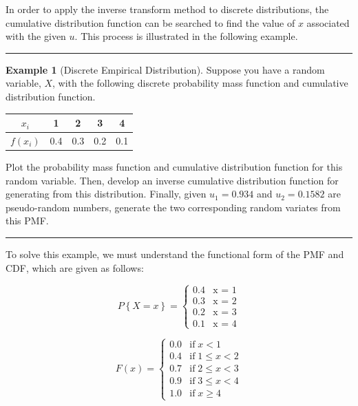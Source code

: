 \documentclass[
]{book}
\theoremstyle{definition}
\theoremstyle{definition}
\newtheorem{example}{Example}[chapter]
\theoremstyle{definition}
\theoremstyle{definition}
\theoremstyle{remark}
\begin{document}
In order to apply the inverse transform method to
discrete distributions, the cumulative distribution function can be
searched to find the value of \(x\) associated with the given \(u\). This
process is illustrated in the following example.

\begin{center}\rule{0.5\linewidth}{0.5pt}\end{center}

\begin{example}[Discrete Empirical Distribution]
\protect\hypertarget{exm:DiscreteCDF}{}{\label{exm:DiscreteCDF} {} }Suppose you have a random variable, \(X\), with the following discrete probability mass
function and cumulative distribution function.
\end{example}

\begin{longtable}[]{@{}ccccc@{}}
\toprule
\(x_{i}\) & 1 & 2 & 3 & 4 \\
\midrule
\endhead
\(f(x_{i})\) & 0.4 & 0.3 & 0.2 & 0.1 \\
\bottomrule
\end{longtable}

Plot the probability mass function and cumulative distribution function
for this random variable. Then, develop an inverse cumulative
distribution function for generating from this distribution. Finally,
given \(u_1 = 0.934\) and \(u_2 = 0.1582\) are pseudo-random numbers,
generate the two corresponding random variates from this PMF.

\begin{center}\rule{0.5\linewidth}{0.5pt}\end{center}

To solve this example, we must understand the functional form of the PMF and CDF, which are given as follows:

\[
P\left\{X=x\right\} = 
\begin{cases}
    0.4 & \text{x = 1}\\
    0.3 & \text{x = 2}\\
    0.2 & \text{x = 3}\\
    0.1 & \text{x = 4}
\end{cases}
\]

\[
F(x) =
\begin{cases}
0.0 & \text{if} \; x < 1\\
0.4 & \text{if} \; 1 \le x < 2\\
0.7 & \text{if} \; 2 \le x < 3\\
0.9 & \text{if} \; 3 \le x < 4\\
1.0 & \text{if} \; x \geq 4
\end{cases}
\]
\end{document}
